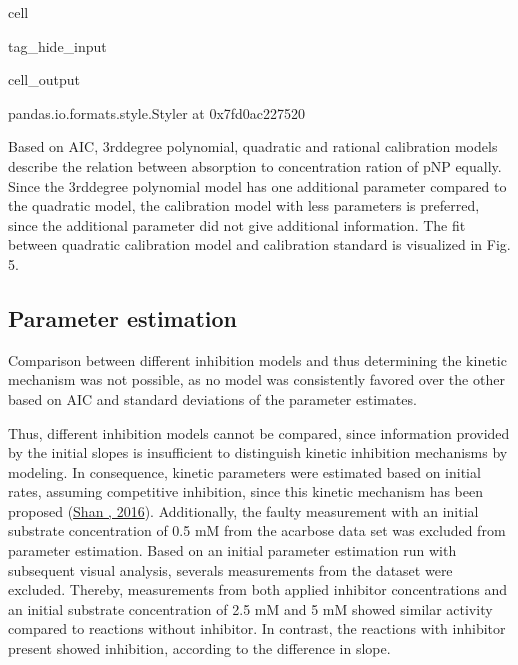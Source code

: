 \documentclass[letterpaper,12pt,english]{jupyterBook}
\begin{document}
\begin{sphinxuseclass}{cell}
\begin{sphinxuseclass}{tag_hide_input}
\begin{sphinxVerbatimOutput}
\begin{sphinxuseclass}{cell_output}
\begin{sphinxVerbatim}[commandchars=\\\{\}]
\PYGZlt{}pandas.io.formats.style.Styler at 0x7fd0ac227520\PYGZgt{}
\end{sphinxVerbatim}

\noindent{}

\end{sphinxuseclass}\end{sphinxVerbatimOutput}

\end{sphinxuseclass}
\end{sphinxuseclass}
\sphinxAtStartPar
{}

\sphinxAtStartPar
Based on AIC, 3rd\sphinxhyphen{}degree polynomial, quadratic and rational calibration models describe the relation between absorption to concentration ration of p\sphinxhyphen{}NP equally. Since the 3rd\sphinxhyphen{}degree polynomial model has one additional parameter compared to the quadratic model, the calibration model with less parameters is preferred, since the additional parameter did not give additional information. The fit between quadratic calibration model and calibration standard is visualized in Fig. 5.


\subsection{Parameter estimation}
\label{\detokenize{scenarios/glycosidase_inhibition:parameter-estimation}}
\sphinxAtStartPar
Comparison between different inhibition models and thus determining the kinetic mechanism was not possible, as no model was consistently favored over the other based on AIC and standard deviations of the parameter estimates.

\sphinxAtStartPar
Thus, different inhibition models cannot be compared, since information provided by the initial slopes is insufficient to distinguish kinetic inhibition mechanisms by modeling. In consequence, kinetic parameters were estimated based on initial rates, assuming competitive inhibition, since this kinetic mechanism has been proposed (\hyperlink{cite.references:id26}{Shan , 2016}). Additionally, the faulty measurement with an initial substrate concentration of 0.5 mM from the acarbose data set was excluded from parameter estimation.
Based on an initial parameter estimation run with subsequent visual analysis, severals measurements from the  dataset were excluded. Thereby, measurements from both applied inhibitor concentrations and an initial substrate concentration of 2.5 mM and 5 mM showed similar activity compared to reactions without inhibitor. In contrast, the reactions with inhibitor present showed inhibition, according to the difference in slope.
\end{document}
